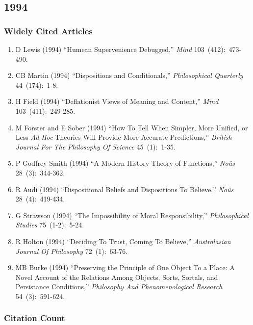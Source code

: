 \documentclass[
  10pt,
  letterpaper,
  DIV=11,
  numbers=noendperiod,
  twoside]{scrartcl}
\providecommand{\tightlist}{%
  \setlength{\itemsep}{0pt}\setlength{\parskip}{0pt}}\usepackage{longtable,booktabs,array}
\begin{document}
\newpage

\subsection{1994}\label{sec-s1994}

\subsubsection*{Widely Cited Articles}\label{widely-cited-articles-37}

\begin{enumerate}
\def\labelenumi{\arabic{enumi}.}
\tightlist
\item
  D Lewis (1994) ``Humean Supervenience Debugged,'' \emph{Mind}
  103~(412):~473-490.
\item
  CB Martin (1994) ``Dispositions and Conditionals,''
  \emph{Philosophical Quarterly} 44~(174):~1-8.
\item
  H Field (1994) ``Deflationist Views of Meaning and Content,''
  \emph{Mind} 103~(411):~249-285.
\item
  M Forster and E Sober (1994) ``How To Tell When Simpler, More Unified,
  or Less \emph{Ad Hoc} Theories Will Provide More Accurate
  Predictions,'' \emph{British Journal For The Philosophy Of Science}
  45~(1):~1-35.
\item
  P Godfrey-Smith (1994) ``A Modern History Theory of Functions,''
  \emph{Noûs} 28~(3):~344-362.
\item
  R Audi (1994) ``Dispositional Beliefs and Dispositions To Believe,''
  \emph{Noûs} 28~(4):~419-434.
\item
  G Strawson (1994) ``The Impossibility of Moral Responsibility,''
  \emph{Philosophical Studies} 75~(1-2):~5-24.
\item
  R Holton (1994) ``Deciding To Trust, Coming To Believe,''
  \emph{Australasian Journal Of Philosophy} 72~(1):~63-76.
\item
  MB Burke (1994) ``Preserving the Principle of One Object To a Place: A
  Novel Account of the Relations Among Objects, Sorts, Sortals, and
  Persistance Conditions,'' \emph{Philosophy And Phenomenological
  Research} 54~(3):~591-624.
\end{enumerate}

\subsubsection*{Citation Count}\label{sec-count-1994}
\end{document}

